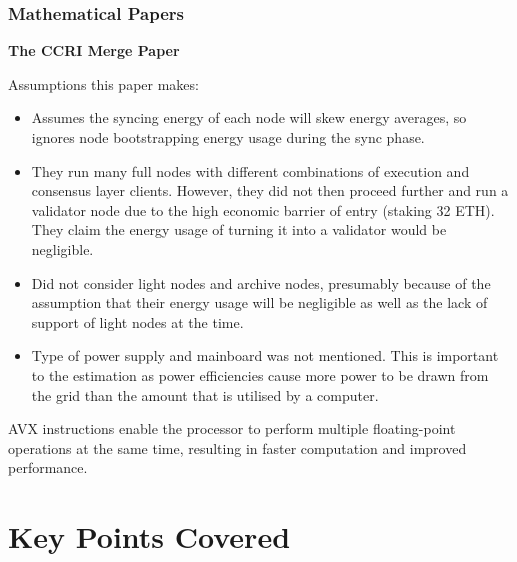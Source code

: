 
\subsubsection{Mathematical Papers}




\textbf{The CCRI Merge Paper } \cite{CCRI:Network}

Assumptions this paper makes:
\begin{itemize}
    \item Assumes the syncing energy of each node will skew energy averages, so ignores node bootstrapping energy usage during the sync phase.
    
    \item They run many full nodes with different combinations of execution and consensus layer clients. However, they did not then proceed further and run a validator node due to the high economic barrier of entry (staking 32 ETH). They claim the energy usage of turning it into a validator would be negligible.
    
    \item Did not consider light nodes and archive nodes, presumably because of the assumption that their energy usage will be negligible as well as the lack of support of light nodes at the time.

    \item Type of power supply and mainboard was not mentioned. This is important to the estimation as power efficiencies cause more power to be drawn from the grid than the amount that is utilised by a computer.
\end{itemize}



AVX instructions enable the processor to perform multiple floating-point operations at the same time, resulting in faster computation and improved performance. \cite{Schuchart2016TheScale}



\section{Key Points Covered}
